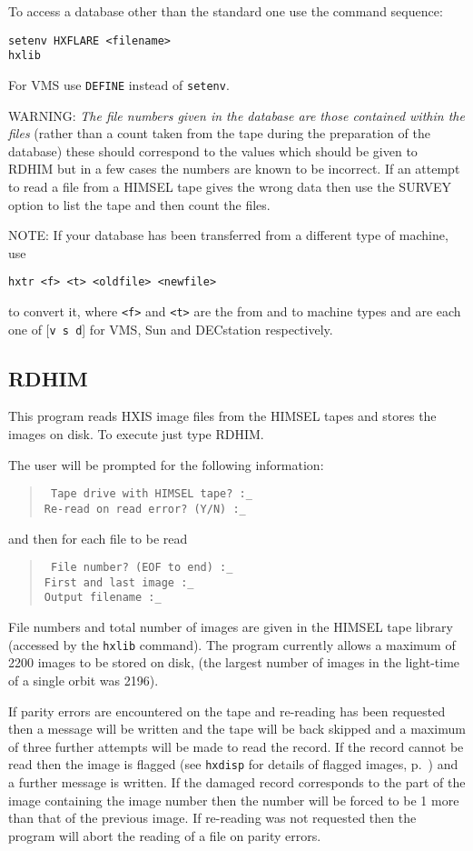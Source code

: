 To access a database other than the standard one use the command
sequence:
\begin{verbatim}
setenv HXFLARE <filename>
hxlib
\end{verbatim}
For VMS use \verb!DEFINE! instead of \verb!setenv!.

WARNING: {\em The file numbers given in the database are those
contained within the files} (rather than a count taken from the tape
during the preparation of the database) these should correspond to the
values which should be given to RDHIM but in a few cases the numbers
are known to be incorrect. If an attempt to read a file from a HIMSEL
tape gives the wrong data then use the SURVEY option to list the tape
and then count the files.

NOTE: If your database has been transferred from a different type of
machine, use
\begin{verbatim}
hxtr <f> <t> <oldfile> <newfile>
\end{verbatim}
to convert it,
where \verb!<f>! and \verb!<t>! are the from and to machine types and
are each one of [\verb!v s d!] for VMS, Sun and DECstation respectively.

\subsection{RDHIM}
\label{RDHIM}

This program reads HXIS image files from the HIMSEL tapes and stores
the images on disk. To execute just type RDHIM.

The user will be prompted for the following information:
\begin{quote} \tt
Tape drive with HIMSEL tape? :\_\\
Re-read on read error? (Y/N) :\_
\end{quote}
and then for each file to be read
\begin{quote} \tt
File number? (EOF to end) :\_\\
First and last image :\_ \\
Output filename :\_
\end{quote}

File numbers and total number of images are given in the HIMSEL tape
library (accessed by the \verb!hxlib! command). The program currently
allows a maximum of 2200 images to be stored on disk, (the largest
number of images in the light-time of a single orbit was 2196).

If parity errors are encountered on the tape and re-reading has been
requested then a message will be written and the tape will be back
skipped and a maximum of three further attempts will be made to read
the record. If the record cannot be read then the image is flagged (see
\verb!hxdisp! for details of flagged images, p.~\pageref{fl}) and a
further message is written. If the damaged record corresponds to the
part of the image containing the image number then the number will be
forced to be 1 more than that of the previous image. If re-reading was
not requested then the program will abort the reading of a file on
parity errors.

